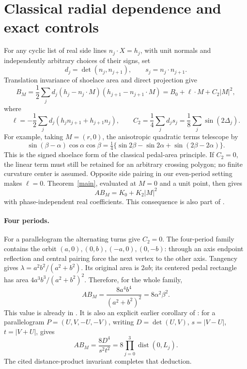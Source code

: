 \documentclass[11pt]{article}
\begin{document}
\section{Classical radial dependence and exact controls}\label{controls}
For any cyclic list of real side lines \(n_j\cdot X=h_j\), with
unit normals and independently arbitrary choices of their signs, set
\[
 d_j=\det(n_j,n_{j+1}),\qquad s_j=n_j\cdot n_{j+1}.
\]
Translation invariance of shoelace area and direct projection give
\[
 B_M=\frac12\sum_jd_j(h_j-n_j\cdot M)(h_{j+1}-n_{j+1}\cdot M)
     =B_0+\ell\cdot M+C_2|M|^2,
\]
where
\[
 \ell=-\frac12\sum_jd_j(h_jn_{j+1}+h_{j+1}n_j),\qquad
 C_2=\frac14\sum_j d_js_j
     =\frac18\sum_j\sin(2\Delta_j).
\]
For example, taking \(M=(r,0)\), the anisotropic quadratic terms
telescope by
\[
 \sin(\beta-\alpha)\cos\alpha\cos\beta
 =\tfrac14\{\sin2\beta-\sin2\alpha+\sin(2\beta-2\alpha)\}.
\]
This is the signed shoelace form of the classical pedal-area principle.
If \(C_2=0\), the linear term must still be retained for an arbitrary
crossing polygon; no finite curvature center is assumed.
Opposite side pairing in our even-period setting makes \(\ell=0\).
Theorem~\ref{main}, evaluated at \(M=0\) and a unit point, then gives
\[
 A B_M=K_0+K_2|M|^2
\]
with phase-independent real coefficients. This consequence is also
part of \cite[Theorem A]{ferudun}.

\paragraph{Four periods.}
For a parallelogram the alternating turns give \(C_2=0\).
The four-period family contains the orbit
\((a,0),(0,b),(-a,0),(0,-b)\):
through an axis endpoint reflection and central pairing force the
next vertex to the other axis. Tangency gives
\(\lambda=a^2b^2/(a^2+b^2)\). Its original area is \(2ab\);
its centered pedal rectangle has area
\(4a^3b^3/(a^2+b^2)^2\). Therefore, for the whole family,
\[
 A B_M=\frac{8a^4b^4}{(a^2+b^2)^2}=8\alpha^2\beta^2.
\]
This value is already in \cite[Theorem A]{ferudun}.
It is also an explicit earlier corollary of
\cite[Theorem~4.3(2)]{bt}: for a parallelogram
\(P=(U,V,-U,-V)\), writing \(D=\det(U,V)\),
\(s=|V-U|\), \(t=|V+U|\), gives
\[
 A B_M=\frac{8D^4}{s^2t^2}
       =8\prod_{j=0}^3\operatorname{dist}(0,L_j).
\]
The cited distance-product invariant completes that deduction.
\end{document}
